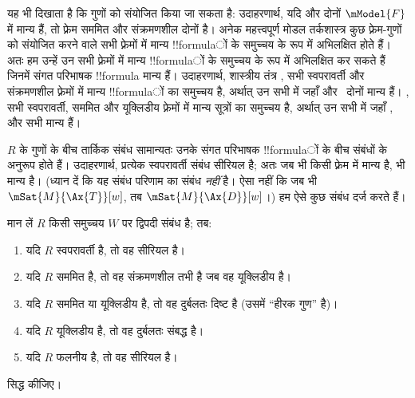 \documentclass[../../../include/open-logic-section]{subfiles}
\begin{document}
 यह भी दिखाता है कि गुणों को संयोजित किया जा
सकता है: उदाहरणार्थ, यदि  और  दोनों $\mModel{F}$ में मान्य हैं,
तो फ़्रेम सममित और संक्रमणशील दोनों है। अनेक महत्त्वपूर्ण मोडल तर्कशास्त्र
कुछ फ़्रेम-गुणों को संयोजित करने वाले सभी फ़्रेमों में मान्य !!{formula}ों के
समुच्चय के रूप में अभिलक्षित होते हैं। अतः हम उन्हें उन सभी फ़्रेमों में
मान्य !!{formula}ों के समुच्चय के रूप में अभिलक्षित कर सकते हैं जिनमें संगत
परिभाषक !!{formula} मान्य हैं। उदाहरणार्थ, शास्त्रीय तंत्र , सभी
स्वपरावर्ती और संक्रमणशील फ़्रेमों में मान्य !!{formula}ों का समुच्चय है,
अर्थात् उन सभी में जहाँ  और~ दोनों मान्य हैं। , सभी
स्वपरावर्ती, सममित और यूक्लिडीय फ़्रेमों में मान्य सूत्रों का समुच्चय है,
अर्थात् उन सभी में जहाँ ,  और  सभी मान्य हैं।

$R$ के गुणों के बीच तार्किक संबंध सामान्यतः उनके संगत परिभाषक !!{formula}ों
के बीच संबंधों के अनुरूप होते हैं। उदाहरणार्थ, प्रत्येक स्वपरावर्ती संबंध
सीरियल है; अतः जब भी  किसी फ़्रेम में मान्य है,  भी मान्य है।
(ध्यान दें कि यह संबंध परिणाम का संबंध \emph{नहीं} है। ऐसा नहीं कि जब भी
$\mSat{M}{\Ax{T}}[w]$, तब $\mSat{M}{\Ax{D}}[w]$।) हम ऐसे कुछ संबंध दर्ज
करते हैं।

\begin{prop}
  मान लें $R$ किसी समुच्चय $W$ पर द्विपदी संबंध है; तब:
  \begin{enumerate}
  \item यदि $R$ स्वपरावर्ती है, तो वह सीरियल है।
  \item यदि $R$ सममित है, तो वह संक्रमणशील तभी है जब वह यूक्लिडीय है।
  \item यदि $R$ सममित या यूक्लिडीय है, तो वह दुर्बलतः दिष्ट है (उसमें
    ``हीरक गुण'' है)।
  \item यदि $R$ यूक्लिडीय है, तो वह दुर्बलतः संबद्ध है।
  \item यदि $R$ फलनीय है, तो वह सीरियल है।
  \end{enumerate}
\end{prop}

\begin{prob}
   सिद्ध कीजिए।
\end{prob}
\end{document}
